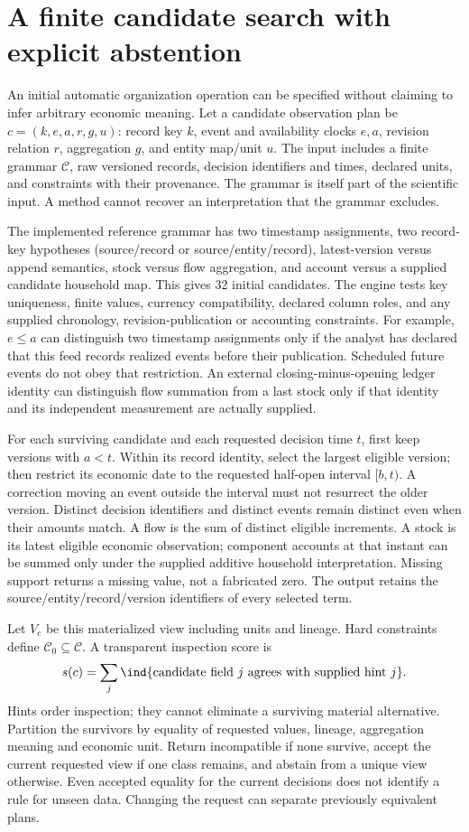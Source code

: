 \section{A finite candidate search with explicit abstention}
\label{s4:organization-algorithm}
An initial automatic organization operation can be specified without
claiming to infer arbitrary economic meaning. Let a candidate observation
plan be $c=(k,e,a,r,g,u)$: record key $k$, event and availability clocks
$e,a$, revision relation $r$, aggregation $g$, and entity map/unit $u$.
The input includes a finite grammar $\mathcal C$, raw versioned records,
decision identifiers and times, declared units, and constraints with their
provenance. The grammar is itself part of the scientific input. A method
cannot recover an interpretation that the grammar excludes.

The implemented reference grammar has two timestamp assignments, two
record-key hypotheses (source/record or source/entity/record), latest-version
versus append semantics, stock versus flow aggregation, and account versus
a supplied candidate household map. This gives 32 initial candidates.
The engine tests key uniqueness, finite values, currency compatibility,
declared column roles, and any supplied chronology, revision-publication
or accounting constraints. For example, $e\le a$ can distinguish two
timestamp assignments only if the analyst has declared that this feed
records realized events before their publication. Scheduled future events
do not obey that restriction. An external closing-minus-opening ledger
identity can distinguish flow summation from a last stock only if that
identity and its independent measurement are actually supplied.

For each surviving candidate and each requested decision time $t$, first
keep versions with $a<t$. Within its record identity, select the largest
eligible version; then restrict its economic date to the requested
half-open interval $[b,t)$. A correction moving an event outside the
interval must not resurrect the older version. Distinct decision identifiers
and distinct events remain distinct even when their amounts match.
A flow is the sum of distinct eligible increments. A stock is its latest
eligible economic observation; component accounts at that instant can be
summed only under the supplied additive household interpretation. Missing
support returns a missing value, not a fabricated zero. The output retains
the source/entity/record/version identifiers of every selected term.

Let $V_c$ be this materialized view including units and lineage. Hard
constraints define $\mathcal C_0\subseteq\mathcal C$. A transparent
inspection score is
\[
 s(c)=\sum_j\ind\{\text{candidate field }j\text{ agrees with supplied hint }j\}.
\]
Hints order inspection; they cannot eliminate a surviving material
alternative. Partition the survivors by equality of requested values,
lineage, aggregation meaning and economic unit. Return incompatible if
none survive, accept the current requested view if one class remains,
and abstain from a unique view otherwise. Even accepted equality for the
current decisions does not identify a rule for unseen data. Changing the
request can separate previously equivalent plans.

